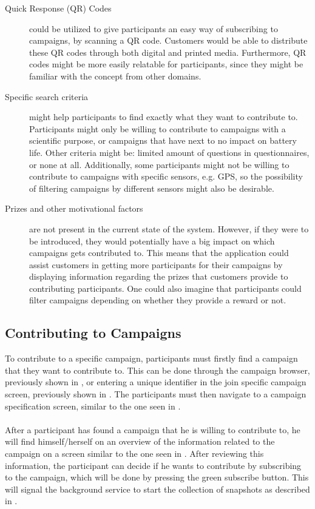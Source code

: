 \begin{description}
    \item[Quick Response (QR) Codes] could be utilized to give participants an easy way of subscribing to campaigns, by scanning a QR code. Customers would be able to distribute these QR codes through both digital and printed media. Furthermore, QR codes might be more easily relatable for participants, since they might be familiar with the concept from other domains.

    \item[Specific search criteria] might help participants to find exactly what they want to contribute to. Participants might only be willing to contribute to campaigns with a scientific purpose, or campaigns that have next to no impact on battery life. Other criteria might be: limited amount of questions in questionnaires, or none at all. Additionally, some participants might not be willing to contribute to campaigns with specific sensors, e.g. GPS, so the possibility of filtering campaigns by different sensors might also be desirable.

    \item[Prizes and other motivational factors] are not present in the current state of the system. However, if they were to be introduced, they would potentially have a big impact on which campaigns gets contributed to. This means that the application could assist customers in getting more participants for their campaigns by displaying information regarding the prizes that customers provide to contributing participants. One could also imagine that participants could filter campaigns depending on whether they provide a reward or not.
\end{description} 

\subsection{Contributing to Campaigns}
\label{sub:contributing_to_campaigns}

To contribute to a specific campaign, participants must firstly find a campaign that they want to contribute to. This can be done through the campaign browser, previously shown in , or entering a unique identifier in the join specific campaign screen, previously shown in . The participants must then navigate to a campaign specification screen, similar to the one seen in . 
\\\\
After a participant has found a campaign that he is willing to contribute to, he will find himself/herself on an overview of the information related to the campaign on a screen similar to the one seen in . After reviewing this information, the participant can decide if he wants to contribute by subscribing to the campaign, which will be done by pressing the green subscribe button. This will signal the background service to start the collection of snapshots as described in .

